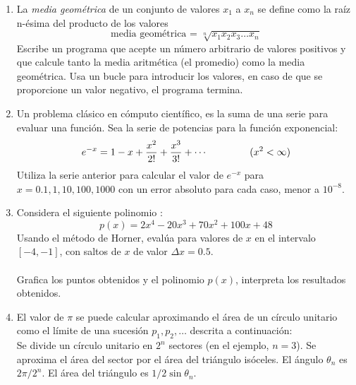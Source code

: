 \documentclass[12pt]{article}
\begin{document}
\begin{enumerate}
\item La \textit{media geom\'{e}trica} de un conjunto de valores $x_{1}$ a $x_{n}$ se define como la ra\'{i}z n-\'{e}sima del producto de los valores
\[ \text{media geom\'{e}trica = } \sqrt[n]{x_{1}x_{2}x_{3} \ldots x_{n}}\]
Escribe un programa que acepte un n\'{u}mero arbitrario de valores positivos y que calcule tanto la media aritm\'{e}tica (el promedio) como la media geom\'{e}trica. Usa un bucle para introducir los valores, en caso de que se proporcione un valor negativo, el programa termina.
\item Un problema cl\'{a}sico en c\'{o}mputo cient\'{i}fico, es la suma de una serie para evaluar una funci\'{o}n. Sea la serie de potencias para la funci\'{o}n exponencial:
\[e^{-x} = 1 - x + \dfrac{x^{2}}{2!} + \dfrac{x^{3}}{3!} +\cdots \hspace{1.5cm} (x^{2} < \infty)  \]
Utiliza la serie anterior para calcular el valor de $e^{-x}$ para $x=0.1,1,10, 100, 1000$ con un error absoluto para cada caso, menor a $10^{-8}$.
\item Considera el siguiente polinomio :
\[p(x)= 2x^{4} - 20x^{3} + 70x^{2}+ 100x+48 \]
Usando el m\'{e}todo de Horner, eval\'{u}a para valores de $x$ en el intervalo $[-4,-1]$, con saltos de $x$ de valor $\Delta x = 0.5$.
\\
\\
Grafica los puntos obtenidos y el polinomio $p(x)$, interpreta los resultados obtenidos.
\item El valor de $\pi$ se puede calcular aproximando el \'{a}rea de un c\'{i}rculo unitario como el l\'{i}mite de una sucesi\'{o}n $p_{1}, p_{2}, \ldots$ descrita a continuaci\'{o}n:
\\
Se divide un c\'{i}rculo unitario en $2^{n}$ sectores (en el ejemplo, $n=3$). Se aproxima el \'{a}rea del sector por el \'{a}rea del tri\'{a}ngulo is\'{o}celes. El \'{a}ngulo $\theta_{n}$ es $2 \pi / 2^{n}$. El \'{a}rea del tri\'{a}ngulo es $1/2 \sin \theta_{n}$.
\\
\begin{figure}[H]
\centering
{}
\end{figure}
\end{enumerate}
\end{document}
